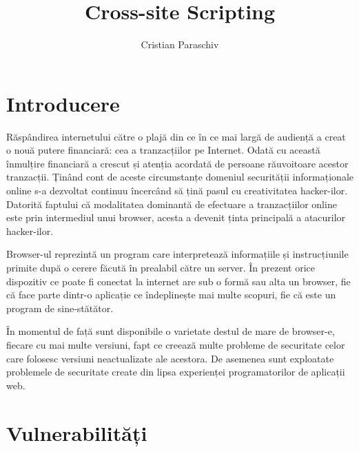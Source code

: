 \documentclass[12pt,a4paper,draft]{article}
\author{Cristian Paraschiv}
\title{Cross-site Scripting}
\begin{document}
	\section{Introducere}
	Răspândirea internetului către o plajă din ce în ce mai largă de audien\-ță a creat o nouă putere financiară: cea a tranzacțiilor pe Internet. Odată cu această înmulțire financiară a crescut și atenția acordată de persoane răuvoitoare acestor tranzacții. Ținând cont de aceste circumstanțe domeniul securității informaționale online s-a dezvoltat continuu încercând să țină pasul cu creativitatea hacker-ilor. Datorită faptului că modalitatea dominantă de efectuare a tranzacțiilor online este prin intermediul unui browser, acesta a devenit ținta principală a atacurilor hacker-ilor.
	
	Browser-ul reprezintă un program care interpretează informațiile și in\-strucțiunile primite după o cerere făcută în prealabil către un server. În prezent orice dispozitiv ce poate fi conectat la internet are sub o formă sau alta un browser, fie că face parte dintr-o aplicație ce îndeplinește mai multe scopuri, fie că este un program de sine-stătător.
	
	În momentul de față sunt disponibile o varietate destul de mare de \linebreak browser-e, fiecare cu mai multe versiuni, fapt ce creează multe probleme de securitate celor care folosesc versiuni neactualizate ale acestora. De asemenea sunt exploatate problemele de securitate create din lipsa experienței  programatorilor de aplicații web.
	
	\section{Vulnerabilități}	
	
\end{document}
